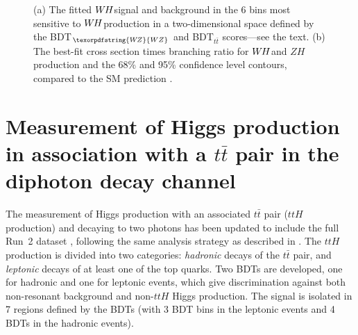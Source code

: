 \documentclass{moriond}
\def\wh{\texorpdfstring{\ensuremath{W\kern -0.1em H}\xspace}{WH\xspace}}
\def\wz{\texorpdfstring{\ensuremath{W\kern -0.1em Z}\xspace}{WZ\xspace}}
\def\zh{\ensuremath{ZH}\xspace}
\begin{document}
\begin{figure}[!htbp]
  \centering
  \caption{
    (a) The fitted \wh signal and background in the 6 bins most sensitive to \wh production in a
    two-dimensional space defined by the BDT$_{\wz}$ and BDT$_{t\bar t}$ scores---see the text.
    (b) The best-fit cross section times branching ratio for \wh and \zh production and the 68\% and
    95\% confidence level contours, compared to the SM prediction \cite{HIGG-2017-14}.
  }
  \label{fig:ww_vh}
\end{figure}

\section{Measurement of Higgs production in association with a $t\bar t$ pair in the diphoton decay channel}\label{sec:ttH_yy}

The measurement of Higgs production with an associated $t\bar t$ pair ($ttH$ production) and decaying
to two photons has been updated to include the full Run~2 dataset \cite{ATLAS-CONF-2019-004},
following the same analysis strategy as described in \cite{Aaboud:2018urx}. The $ttH$ production is
divided into two categories: {\itshape hadronic} decays of the $t\bar t$ pair, and
{\itshape leptonic} decays of at least one of the top quarks. Two BDTs are developed, one
for hadronic and one for leptonic events, which give discrimination against both non-resonant
background and non-$ttH$ Higgs production. The signal is isolated in 7 regions defined by the BDTs
(with 3 BDT bins in the leptonic events and 4 BDTs in the hadronic events).
\end{document}
